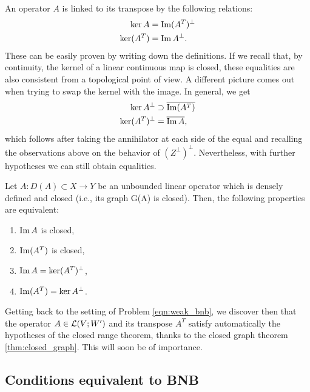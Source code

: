 An operator $A$ is linked to its transpose by the following relations:
\begin{align}
	\ker A &= \operatorname{Im} (A^T)^\perp \\
	\ker (A^T) &= \operatorname{Im} A^\perp.
\end{align}
These can be easily proven by writing down the definitions. If we recall that, by continuity, the kernel of a linear continuous map is closed, these equalities are also consistent from a topological point of view. A different picture comes out when trying to swap the kernel with the image. In general, we get
\begin{align}
	\ker A^\perp &\supset \overline{\operatorname{Im} (A^T)} \\
	\ker (A^T)^\perp &= \overline{\operatorname{Im} A},
\end{align}
which follows after taking the annihilator at each side of the equal and recalling the observations above on the behavior of $(Z^\perp)^\perp$. Nevertheless, with further hypotheses we can still obtain equalities.

\begin{theorem}\label{thm:closed_range}
	Let $A: D(A) \subset X \to Y$ be an unbounded linear operator which is densely defined and closed (i.e., its graph G(A) is closed). Then, the following properties are equivalent:
	\begin{enumerate}
		\item $\operatorname{Im} A$ is closed,
		\item $\operatorname{Im} (A^T)$ is closed,
		\item $\operatorname{Im} A = \ker (A^T)^\perp$,
		\item $\operatorname{Im} (A^T) = \ker A^\perp$.
	\end{enumerate}
\end{theorem}

Getting back to the setting of Problem \eqref{eqn:weak_bnb}, we discover then that the operator $A \in \mathcal{L}(V;W')$ and its transpose $A^T$ satisfy automatically the hypotheses of the closed range theorem, thanks to the closed graph theorem \ref{thm:closed_graph}. This will soon be of importance.


\subsection{Conditions equivalent to BNB}

